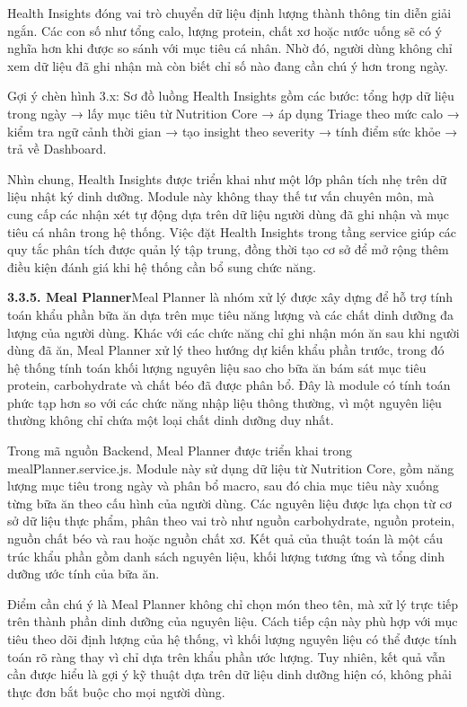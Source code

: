 Health Insights đóng vai trò chuyển dữ liệu định lượng thành thông tin diễn giải ngắn. Các con số như tổng calo, lượng protein, chất xơ hoặc nước uống sẽ có ý nghĩa hơn khi được so sánh với mục tiêu cá nhân. Nhờ đó, người dùng không chỉ xem dữ liệu đã ghi nhận mà còn biết chỉ số nào đang cần chú ý hơn trong ngày.

Gợi ý chèn hình 3.x: Sơ đồ luồng Health Insights gồm các bước: tổng hợp dữ liệu trong ngày → lấy mục tiêu từ Nutrition Core → áp dụng Triage theo mức calo → kiểm tra ngữ cảnh thời gian → tạo insight theo severity → tính điểm sức khỏe → trả về Dashboard.

Nhìn chung, Health Insights được triển khai như một lớp phân tích nhẹ trên dữ liệu nhật ký dinh dưỡng. Module này không thay thế tư vấn chuyên môn, mà cung cấp các nhận xét tự động dựa trên dữ liệu người dùng đã ghi nhận và mục tiêu cá nhân trong hệ thống. Việc đặt Health Insights trong tầng service giúp các quy tắc phân tích được quản lý tập trung, đồng thời tạo cơ sở để mở rộng thêm điều kiện đánh giá khi hệ thống cần bổ sung chức năng.

\textbf{3.3.5. Meal Planner}Meal Planner là nhóm xử lý được xây dựng để hỗ trợ tính toán khẩu phần bữa ăn dựa trên mục tiêu năng lượng và các chất dinh dưỡng đa lượng của người dùng. Khác với các chức năng chỉ ghi nhận món ăn sau khi người dùng đã ăn, Meal Planner xử lý theo hướng dự kiến khẩu phần trước, trong đó hệ thống tính toán khối lượng nguyên liệu sao cho bữa ăn bám sát mục tiêu protein, carbohydrate và chất béo đã được phân bổ. Đây là module có tính toán phức tạp hơn so với các chức năng nhập liệu thông thường, vì một nguyên liệu thường không chỉ chứa một loại chất dinh dưỡng duy nhất.

Trong mã nguồn Backend, Meal Planner được triển khai trong mealPlanner.service.js. Module này sử dụng dữ liệu từ Nutrition Core, gồm năng lượng mục tiêu trong ngày và phân bổ macro, sau đó chia mục tiêu này xuống từng bữa ăn theo cấu hình của người dùng. Các nguyên liệu được lựa chọn từ cơ sở dữ liệu thực phẩm, phân theo vai trò như nguồn carbohydrate, nguồn protein, nguồn chất béo và rau hoặc nguồn chất xơ. Kết quả của thuật toán là một cấu trúc khẩu phần gồm danh sách nguyên liệu, khối lượng tương ứng và tổng dinh dưỡng ước tính của bữa ăn.

Điểm cần chú ý là Meal Planner không chỉ chọn món theo tên, mà xử lý trực tiếp trên thành phần dinh dưỡng của nguyên liệu. Cách tiếp cận này phù hợp với mục tiêu theo dõi định lượng của hệ thống, vì khối lượng nguyên liệu có thể được tính toán rõ ràng thay vì chỉ dựa trên khẩu phần ước lượng. Tuy nhiên, kết quả vẫn cần được hiểu là gợi ý kỹ thuật dựa trên dữ liệu dinh dưỡng hiện có, không phải thực đơn bắt buộc cho mọi người dùng.

